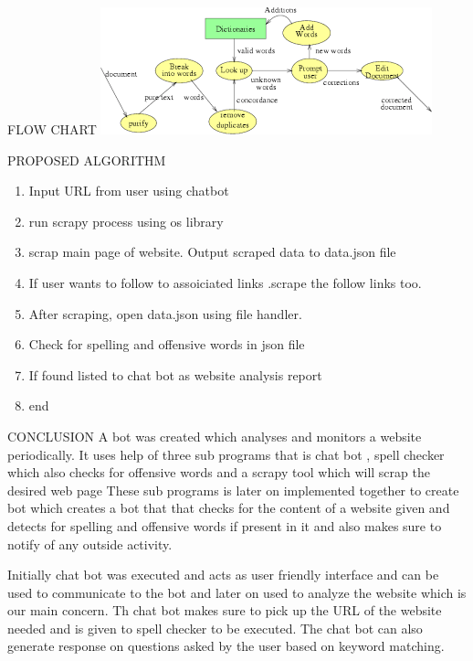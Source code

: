 \documentclass{beamer}
\begin{document}
\begin{frame}{FLOW CHART}
\includegraphics[scale=0.5]{index.png}     
\end{frame}

\begin{frame}{PROPOSED ALGORITHM}
\begin{enumerate}
\item Input URL from user using chatbot
\item run scrapy process using os library 
\item scrap main page of website. Output scraped data to data.json file
\item If user wants to follow to assoiciated links .scrape the follow links too.
\item After scraping, open data.json using file handler.
\item Check for spelling and offensive words in json file
\item If found listed to chat bot as website analysis report
\item end
\end{enumerate}
\end{frame}


\begin{frame}{CONCLUSION}
A bot was created which analyses and monitors a website periodically. It uses help of
three sub programs that is chat bot , spell checker which also checks for offensive
words and a scrapy tool which will scrap the desired web page These sub programs is
later on implemented together to create bot which creates a bot that that checks for the
content of a website given and detects for spelling and offensive words if present in it
and also makes sure to notify of any outside activity.
\end{frame}
\begin{frame}
Initially chat bot was executed and acts as user friendly interface and can be
used to communicate to the bot and later on used to analyze the website which is our
main concern. Th chat bot makes sure to pick up the URL of the website needed and is
given to spell checker to be executed. The chat bot can also generate response on
questions asked by the user based on keyword matching.
\end{frame}
\end{document}
